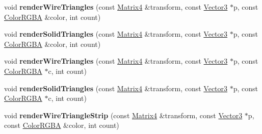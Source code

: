 \begin{DoxyCompactItemize}
\item 
void {\bfseries render\+Wire\+Triangles} (const \hyperlink{class_i_dream_sky_1_1_matrix4}{Matrix4} \&transform, const \hyperlink{class_i_dream_sky_1_1_vector3}{Vector3} $\ast$p, const \hyperlink{class_i_dream_sky_1_1_color_r_g_b_a}{Color\+R\+G\+BA} \&color, int count)\hypertarget{class_i_dream_sky_1_1_i_component_debug_renderer_af372c93580e0832346b311c0daf26872}{}\label{class_i_dream_sky_1_1_i_component_debug_renderer_af372c93580e0832346b311c0daf26872}

\item 
void {\bfseries render\+Solid\+Triangles} (const \hyperlink{class_i_dream_sky_1_1_matrix4}{Matrix4} \&transform, const \hyperlink{class_i_dream_sky_1_1_vector3}{Vector3} $\ast$p, const \hyperlink{class_i_dream_sky_1_1_color_r_g_b_a}{Color\+R\+G\+BA} \&color, int count)\hypertarget{class_i_dream_sky_1_1_i_component_debug_renderer_a39b58dbe83fa0b030da0b5b5d208bead}{}\label{class_i_dream_sky_1_1_i_component_debug_renderer_a39b58dbe83fa0b030da0b5b5d208bead}

\item 
void {\bfseries render\+Wire\+Triangles} (const \hyperlink{class_i_dream_sky_1_1_matrix4}{Matrix4} \&transform, const \hyperlink{class_i_dream_sky_1_1_vector3}{Vector3} $\ast$p, const \hyperlink{class_i_dream_sky_1_1_color_r_g_b_a}{Color\+R\+G\+BA} $\ast$c, int count)\hypertarget{class_i_dream_sky_1_1_i_component_debug_renderer_a2e39808f69cf651fc799059838f951ab}{}\label{class_i_dream_sky_1_1_i_component_debug_renderer_a2e39808f69cf651fc799059838f951ab}

\item 
void {\bfseries render\+Solid\+Triangles} (const \hyperlink{class_i_dream_sky_1_1_matrix4}{Matrix4} \&transform, const \hyperlink{class_i_dream_sky_1_1_vector3}{Vector3} $\ast$p, const \hyperlink{class_i_dream_sky_1_1_color_r_g_b_a}{Color\+R\+G\+BA} $\ast$c, int count)\hypertarget{class_i_dream_sky_1_1_i_component_debug_renderer_a445e495b20e18aa8a47fc54c9cf4221d}{}\label{class_i_dream_sky_1_1_i_component_debug_renderer_a445e495b20e18aa8a47fc54c9cf4221d}

\item 
void {\bfseries render\+Wire\+Triangle\+Strip} (const \hyperlink{class_i_dream_sky_1_1_matrix4}{Matrix4} \&transform, const \hyperlink{class_i_dream_sky_1_1_vector3}{Vector3} $\ast$p, const \hyperlink{class_i_dream_sky_1_1_color_r_g_b_a}{Color\+R\+G\+BA} \&color, int count)\hypertarget{class_i_dream_sky_1_1_i_component_debug_renderer_ae8fca2b8db8a3fcc40c585051cbe952c}{}\label{class_i_dream_sky_1_1_i_component_debug_renderer_ae8fca2b8db8a3fcc40c585051cbe952c}


\end{DoxyCompactItemize}
